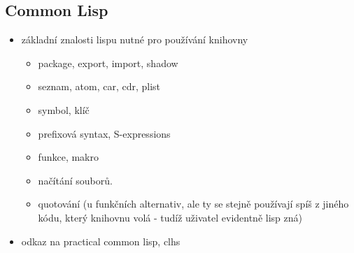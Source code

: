 \subsection{Common Lisp}
\begin{framed}
\begin{itemize}
  \item základní znalosti lispu nutné pro používání knihovny
  \begin{itemize}
    \item package, export, import, shadow
    \item seznam, atom, car, cdr, plist
    \item symbol, klíč
    \item prefixová syntax, S-expressions
    \item funkce, makro
    \item načítání souborů.
    \item quotování (u funkčních alternativ, ale ty se stejně používají spíš z jiného
      kódu, který knihovnu volá - tudíž uživatel evidentně lisp zná)
  \end{itemize}
  \item odkaz na practical common lisp, clhs
\end{itemize}
\end{framed}
